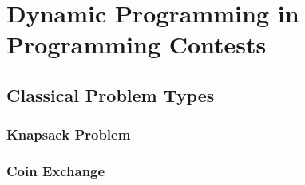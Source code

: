 \section{Dynamic Programming in Programming Contests}

\subsection{Classical Problem Types}

\subsubsection{Knapsack Problem}

\subsubsection{Coin Exchange}